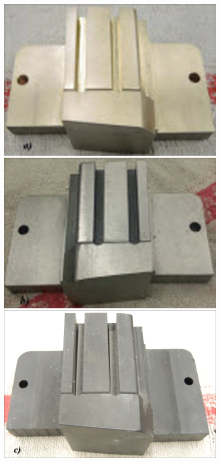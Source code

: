 \documentclass[12pt,a4paper,parskip,twoside,BCOR5mm,headsepline]{scrartcl}
\begin{document}
\begin{description*}
\begin{figure}[H]
\centering
\begin{minipage}[t]{0.3\textwidth}
\includegraphics[width=.9\textwidth]{diebronze}
\end{minipage}
\begin{minipage}[t]{0.3\textwidth}
\includegraphics[width=.9\textwidth]{diestahl}
\end{minipage}
\begin{minipage} [t]{0.3115\textwidth}
\includegraphics[width=.9\textwidth]{diekunst}


\end{minipage}
\end{figure}
\end{description*}
\end{document}
